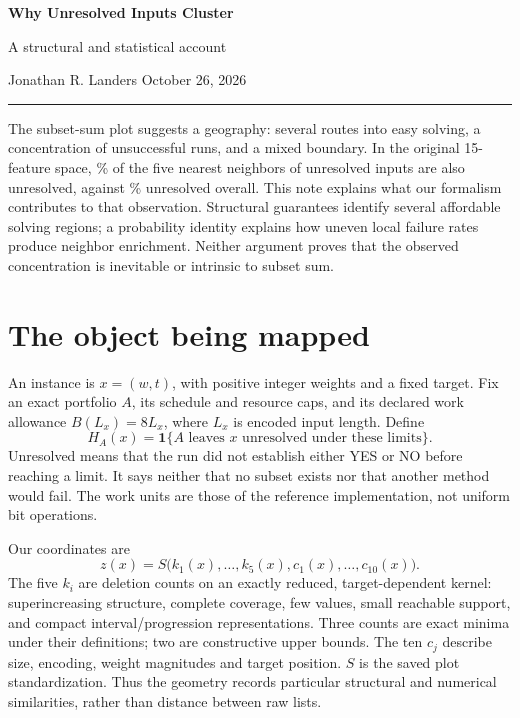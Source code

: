 \documentclass[11pt,english]{article}
\begin{document}
\thispagestyle{plain}
{\LARGE\sffamily\bfseries Why Unresolved Inputs Cluster}\par
\vspace{3pt}
{\large\sffamily A structural and statistical account}\par
\vspace{5pt}
{\small Jonathan R. Landers \hfill October 26, 2026}\par
\textcolor{rulecolor}{\rule{\linewidth}{.6pt}}

The subset-sum plot suggests a geography: several routes into easy solving, a concentration of unsuccessful runs, and a mixed boundary. In the original 15-feature space, \ClusterRate\% of the five nearest neighbors of unresolved inputs are also unresolved, against \ClusterBaseRate\% unresolved overall. This note explains what our formalism contributes to that observation. Structural guarantees identify several affordable solving regions; a probability identity explains how uneven local failure rates produce neighbor enrichment. Neither argument proves that the observed concentration is inevitable or intrinsic to subset sum.

\section{The object being mapped}
An instance is \(x=(w,t)\), with positive integer weights and a fixed target. Fix an exact portfolio \(A\), its schedule and resource caps, and its declared work allowance \(B(L_x)=8L_x\), where \(L_x\) is encoded input length. Define
\[
 H_A(x)=\mathbf 1\{A\text{ leaves }x\text{ unresolved under these limits}\}.
\]
Unresolved means that the run did not establish either YES or NO before reaching a limit. It says neither that no subset exists nor that another method would fail. The work units are those of the reference implementation, not uniform bit operations.

Our coordinates are
\[
 z(x)=S\bigl(k_1(x),\ldots,k_5(x),c_1(x),\ldots,c_{10}(x)\bigr).
\]
The five \(k_i\) are deletion counts on an exactly reduced, target-dependent kernel: superincreasing structure, complete coverage, few values, small reachable support, and compact interval/progression representations. Three counts are exact minima under their definitions; two are constructive upper bounds. The ten \(c_j\) describe size, encoding, weight magnitudes and target position. \(S\) is the saved plot standardization. Thus the geometry records particular structural and numerical similarities, rather than distance between raw lists.
\end{document}

